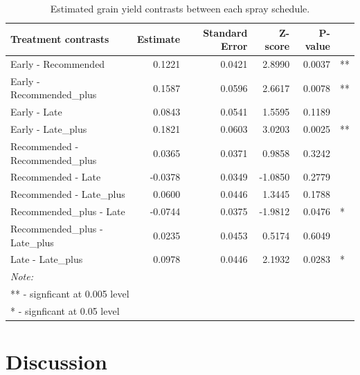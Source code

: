 \documentclass[agronomy,article,submit,moreauthors,pdftex]{mdpi}
\begin{document}
\begin{table}

\caption{\label{tab:Table3}Estimated grain yield contrasts between each spray schedule.}
\centering
\begin{tabular}[t]{lrrrrl}
\toprule
Treatment contrasts & Estimate & Standard Error & Z-score & P-value &  \\
\midrule
Early - Recommended & 0.1221 & 0.0421 & 2.8990 & 0.0037 & **\\
Early - Recommended\_plus & 0.1587 & 0.0596 & 2.6617 & 0.0078 & **\\
Early - Late & 0.0843 & 0.0541 & 1.5595 & 0.1189 & \\
Early - Late\_plus & 0.1821 & 0.0603 & 3.0203 & 0.0025 & **\\
Recommended - Recommended\_plus & 0.0365 & 0.0371 & 0.9858 & 0.3242 & \\
\addlinespace
Recommended - Late & -0.0378 & 0.0349 & -1.0850 & 0.2779 & \\
Recommended - Late\_plus & 0.0600 & 0.0446 & 1.3445 & 0.1788 & \\
Recommended\_plus - Late & -0.0744 & 0.0375 & -1.9812 & 0.0476 & *\\
Recommended\_plus - Late\_plus & 0.0235 & 0.0453 & 0.5174 & 0.6049 & \\
Late - Late\_plus & 0.0978 & 0.0446 & 2.1932 & 0.0283 & *\\
\bottomrule
\multicolumn{6}{l}{\textit{Note: }}\\
\multicolumn{6}{l}{** - signficant at 0.005 level}\\
\multicolumn{6}{l}{* - signficant at 0.05 level}\\
\end{tabular}
\end{table}

\hypertarget{discussion}{%
\section{Discussion}\label{discussion}}
\end{document}
